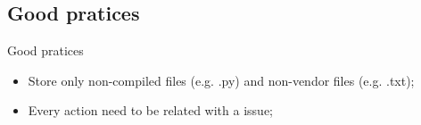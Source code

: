 \subsection{Good pratices}
\begin{frame}{Good pratices}
\begin{itemize}
    \item Store only non-compiled files (e.g. .py) and non-vendor files (e.g. .txt);
    \item Every action need to be related with a issue;
\end{itemize}
\end{frame}